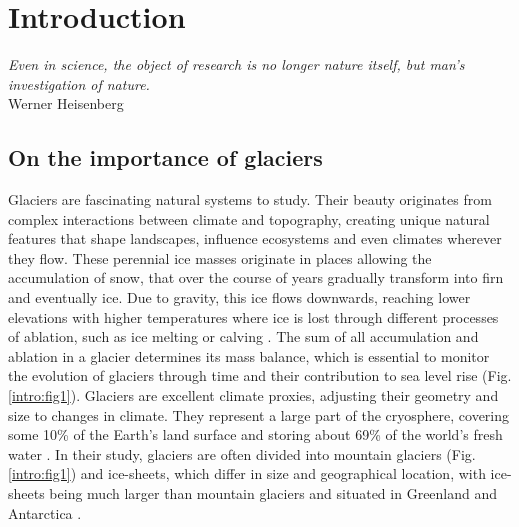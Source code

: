 \chapter{Introduction}
\label{chap:intro}

\begin{flushright}
\begin{small}
\textit{Even in science, the object of research is no longer nature itself, but man's investigation of nature.}\\
Werner Heisenberg
\end{small}
\end{flushright}

\section{On the importance of glaciers}

Glaciers are fascinating natural systems to study. Their beauty originates from complex interactions between climate and topography, creating  unique natural features that shape landscapes, influence ecosystems and even climates wherever they flow. These perennial ice masses originate in places allowing the accumulation of snow, that over the course of years gradually transform into firn and eventually ice. Due to gravity, this ice flows downwards, reaching lower elevations with higher temperatures where ice is lost through different processes of ablation, such as ice melting or calving \citep{ipcc_climate_2018}. The sum of all accumulation and ablation in a glacier determines its mass balance, which is essential to monitor the evolution of glaciers through time and their contribution to sea level rise (Fig. \ref{intro:fig1}). Glaciers are excellent climate proxies, adjusting their geometry and size to changes in climate. They represent a large part of the cryosphere, covering some 10\% of the Earth's land surface and storing about 69\% of the world's fresh water \citep{cuffey_physics_2010}. In their study, glaciers are often divided into mountain glaciers (Fig. \ref{intro:fig1}) and ice-sheets, which differ in size and geographical location, with ice-sheets being much larger than mountain glaciers and situated in Greenland and Antarctica \citep{benn_glaciers_2014}.  

